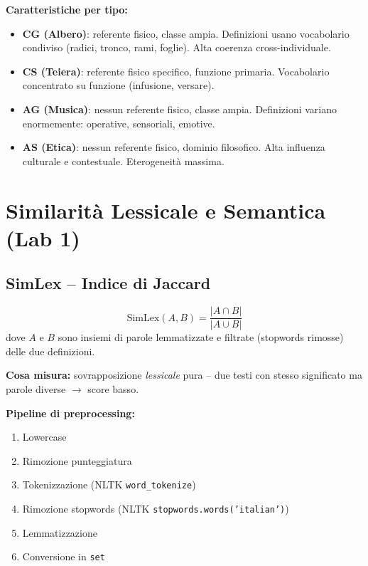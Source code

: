 \documentclass[12pt,a4paper]{article}
\begin{document}
\begin{defbox}
\textbf{Caratteristiche per tipo:}
\begin{itemize}
  \item \textbf{CG (Albero)}: referente fisico, classe ampia. Definizioni usano vocabolario condiviso (radici, tronco, rami, foglie). Alta coerenza cross-individuale.
  \item \textbf{CS (Teiera)}: referente fisico specifico, funzione primaria. Vocabolario concentrato su funzione (infusione, versare).
  \item \textbf{AG (Musica)}: nessun referente fisico, classe ampia. Definizioni variano enormemente: operative, sensoriali, emotive.
  \item \textbf{AS (Etica)}: nessun referente fisico, dominio filosofico. Alta influenza culturale e contestuale. Eterogeneit\`a massima.
\end{itemize}
\end{defbox}

\section{Similarit\`a Lessicale e Semantica (Lab 1)}

\subsection{SimLex -- Indice di Jaccard}

\begin{formulabox}
\[
\text{SimLex}(A, B) = \frac{|A \cap B|}{|A \cup B|}
\]
dove $A$ e $B$ sono insiemi di parole lemmatizzate e filtrate (stopwords rimosse) delle due definizioni.
\end{formulabox}

\textbf{Cosa misura:} sovrapposizione \emph{lessicale} pura -- due testi con stesso significato ma parole diverse $\to$ score basso.

\textbf{Pipeline di preprocessing:}
\begin{enumerate}
  \item Lowercase
  \item Rimozione punteggiatura
  \item Tokenizzazione (NLTK \texttt{word\_tokenize})
  \item Rimozione stopwords (NLTK \texttt{stopwords.words('italian')})
  \item Lemmatizzazione
  \item Conversione in \texttt{set}
\end{enumerate}
\end{document}
